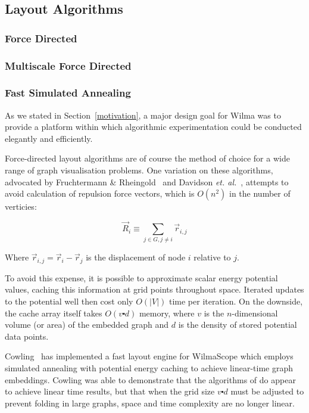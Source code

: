 \documentclass[runningheads]{cl2emult}
\begin{document}
\subsection{Layout Algorithms}
\subsubsection{Force Directed} \label{sec:forcedirectedlayout}
\subsubsection{Multiscale Force Directed}

\subsubsection{Fast Simulated Annealing}

As we stated in Section~\ref{motivation}, a major design goal for Wilma
was to provide a platform within which algorithmic experimentation could be
conducted elegantly and efficiently.

Force-directed layout algorithms are of course the method of choice for a
wide range of graph visualisation problems.  One variation on these
algorithms, advocated by Fruchtermann \&
Rheingold~\cite{fruchtermann90force-directed} and Davidson {\em et.
al.}~\cite{davidson01noise}, attempts to avoid calculation of repulsion force
vectors, which is $O(n^2)$ in the number of verticies:  

\begin{equation}
\vec{R}_i \equiv \sum_{j \in G, j \neq i} \vec{r}_{i,j}
\end{equation}

\noindent Where $\vec{r}_{i,j} = \vec{r}_i - \vec{r}_j$ is the displacement
of node $i$ relative to $j$.

To avoid this expense, it is possible to approximate scalar energy potential
values, caching this information at grid points throughout space.  Iterated
updates to the potential well then cost only $O(|V|)$ time per iteration.  On
the downside, the cache array itself takes $O(v \centerdot d)$ memory, where
$v$ is the $n$-dimensional volume (or area) of the embedded graph and $d$ is
the density of stored potential data points.

Cowling~\cite{cowling02fast} has implemented a fast layout engine for
WilmaScope which employs simulated annealing with potential energy caching
to achieve linear-time graph embeddings.  Cowling was able to demonstrate
that the algorithms of \cite{davidson01noise} do appear to achieve linear
time results, but that when the grid size $v \centerdot d$ must be adjusted to
prevent folding in large graphs, space and time complexity are
no longer linear.
\end{document}

